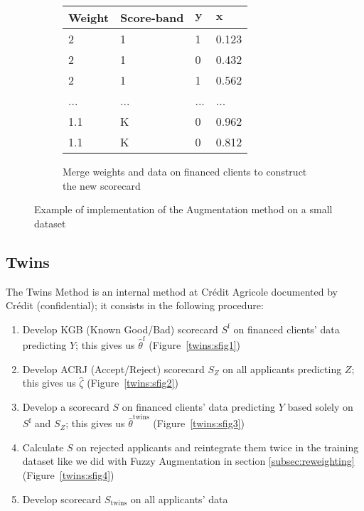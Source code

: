 \begin{figure}
{\begin{multicols}{3}
\begin{subfigure}[t]{0.31\textwidth}
\begin{center}
\begin{adjustbox}{max width=0.95\textwidth}
\begin{tabular}{l l l l}
\toprule
\textbf{Weight} & \textbf{Score-band} & \textbf{${\bm{y}}$} & \textbf{${\bm{x}}$}\\
\midrule
2 & 1 & 1 & 0.123 \\
2 & 1 & 0 & 0.432 \\
2 & 1 & 1 & 0.562 \\
... & ... & ... & ... \\
1.1 & K & 0 & 0.962 \\
1.1 & K & 0 & 0.812 \\
\bottomrule
\end{tabular}
\end{adjustbox}
\end{center}

\caption{Merge weights and data on financed clients to construct the new scorecard}
\label{augment:sfig3}
\end{subfigure}
\end{multicols}
}
\caption{Example of implementation of the Augmentation method on a small dataset}
\label{augmentexample}
\end{figure}

\subsection{Twins} \label{Twins}

The Twins Method is an internal method at Crédit Agricole documented by Crédit \cite{groupe} (confidential); it consists in the following procedure:
\begin{enumerate}
\item Develop KGB (Known Good/Bad) scorecard $S^{\text{f}}$ on financed clients' data predicting $Y$; this gives us $\hat{\theta}^{\text{f}}$ (Figure~\ref{twins:sfig1})
\item Develop ACRJ (Accept/Reject) scorecard $S_Z$ on all applicants predicting $Z$; this gives us $\hat{\zeta}$ (Figure~\ref{twins:sfig2})
\item Develop a scorecard $S$ on financed clients' data predicting $Y$ based solely on $S^{\text{f}}$ and $S_Z$; this gives us $\hat{\theta}^{\text{twins}}$ (Figure~\ref{twins:sfig3})
\item Calculate $S$ on rejected applicants and reintegrate them twice in the training dataset like we did with Fuzzy Augmentation in section \ref{subsec:reweighting} (Figure~\ref{twins:sfig4})
\item Develop scorecard $S_{\text{twins}}$ on all applicants' data
\end{enumerate}

